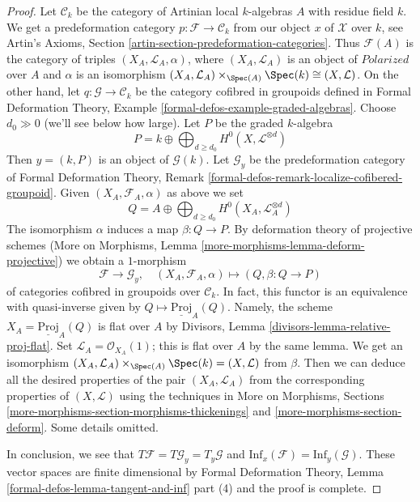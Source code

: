 \begin{proof}
\medskip\noindent
Let $\mathcal{C}_k$ be the category of Artinian local $k$-algebras
$A$ with residue field $k$. We get a predeformation category
$p : \mathcal{F} \to \mathcal{C}_k$ from our object $x$ of $\mathcal{X}$
over $k$, see
Artin's Axioms, Section \ref{artin-section-predeformation-categories}.
Thus $\mathcal{F}(A)$ is the category of triples
$(X_A, \mathcal{L}_A, \alpha)$, where $(X_A, \mathcal{L}_A)$
is an object of $\textit{Polarized}$ over $A$ and $\alpha$ is an isomorphism
$(X_A, \mathcal{L}_A) \times_{\Spec(A)} \Spec(k) \cong (X, \mathcal{L})$.
On the other hand, let $q : \mathcal{G} \to \mathcal{C}_k$
be the category cofibred in groupoids defined in
Formal Deformation Theory, Example \ref{formal-defos-example-graded-algebras}.
Choose $d_0 \gg 0$ (we'll see below how large).
Let $P$ be the graded $k$-algebra
$$
P = k \oplus \bigoplus\nolimits_{d \geq d_0} H^0(X, \mathcal{L}^{\otimes d})
$$
Then $y = (k, P)$ is an object of $\mathcal{G}(k)$.
Let $\mathcal{G}_y$ be the predeformation category of
Formal Deformation Theory, Remark
\ref{formal-defos-remark-localize-cofibered-groupoid}.
Given $(X_A, \mathcal{F}_A, \alpha)$ as above we set
$$
Q = A \oplus \bigoplus\nolimits_{d \geq d_0} H^0(X_A, \mathcal{L}_A^{\otimes d})
$$
The isomorphism $\alpha$ induces a map $\beta : Q \to P$.
By deformation theory of projective schemes
(More on Morphisms, Lemma \ref{more-morphisms-lemma-deform-projective})
we obtain a $1$-morphism
$$
\mathcal{F} \longrightarrow \mathcal{G}_y,\quad
(X_A, \mathcal{F}_A, \alpha) \longmapsto (Q, \beta : Q \to P)
$$
of categories cofibred in groupoids over $\mathcal{C}_k$.
In fact, this functor is an equivalence with quasi-inverse
given by $Q \mapsto \underline{\text{Proj}}_A(Q)$.
Namely, the scheme $X_A = \underline{\text{Proj}}_A(Q)$
is flat over $A$ by Divisors, Lemma \ref{divisors-lemma-relative-proj-flat}.
Set $\mathcal{L}_A = \mathcal{O}_{X_A}(1)$; this is flat over $A$
by the same lemma. We get an isomorphism
$(X_A, \mathcal{L}_A) \times_{\Spec(A)} \Spec(k) = (X, \mathcal{L})$
from $\beta$. Then we can deduce all the desired properties of
the pair $(X_A, \mathcal{L}_A)$ from the corresponding properties
of $(X, \mathcal{L})$ using the techniques in
More on Morphisms, Sections
\ref{more-morphisms-section-morphisms-thickenings} and
\ref{more-morphisms-section-deform}.
Some details omitted.

\medskip\noindent
In conclusion, we see that $T\mathcal{F} = T\mathcal{G}_y = T_y\mathcal{G}$
and $\text{Inf}_x(\mathcal{F}) = \text{Inf}_y(\mathcal{G})$.
These vector spaces are finite dimensional by
Formal Deformation Theory, Lemma
\ref{formal-defos-lemma-tangent-and-inf} part (4)
and the proof is complete.
\end{proof}

